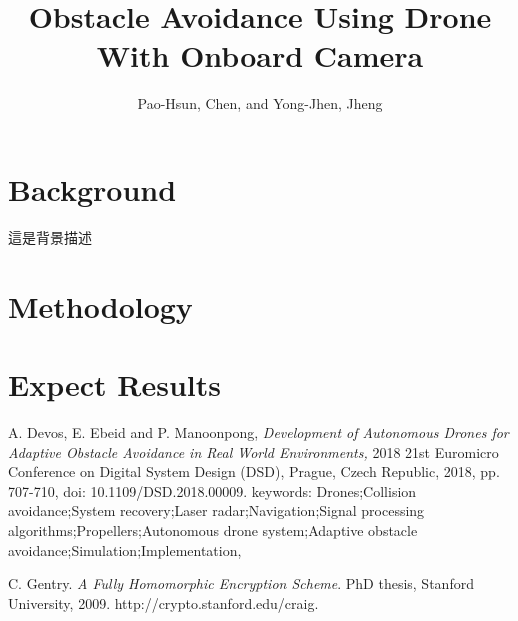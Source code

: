 \documentclass[]{article}
\title{Obstacle Avoidance Using Drone With Onboard Camera}
\author{Pao-Hsun, Chen, and Yong-Jhen, Jheng}
\begin{document}
	
	\maketitle
	
	\section{Background}
     這是背景描述
	\section{Methodology}
	
	\section{Expect Results}
	
	
	\begin{thebibliography}{1}
		
		A. Devos, E. Ebeid and P. Manoonpong, \emph{Development of Autonomous Drones for Adaptive Obstacle Avoidance in Real World Environments,} 2018 21st Euromicro Conference on Digital System Design (DSD), Prague, Czech Republic, 2018, pp. 707-710, doi: 10.1109/DSD.2018.00009. keywords: {Drones;Collision avoidance;System recovery;Laser radar;Navigation;Signal processing algorithms;Propellers;Autonomous drone system;Adaptive obstacle avoidance;Simulation;Implementation},
		
		
		
		C. Gentry. \emph{A Fully Homomorphic Encryption Scheme}. PhD thesis, Stanford University, 2009. http://crypto.stanford.edu/craig.
		
	\end{thebibliography}
	
\end{document}
